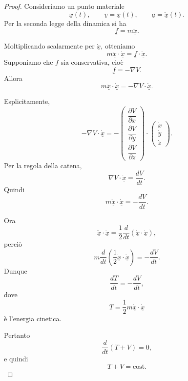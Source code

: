 \begin{proof}
Consideriamo un punto materiale
\[
\underline{x}(t),
\qquad
\underline{v}=\dot{\underline{x}}(t),
\qquad
\underline{a}=\ddot{\underline{x}}(t).
\]
Per la seconda legge della dinamica si ha
\[
\underline{f}=m\ddot{\underline{x}}.
\]

Moltiplicando scalarmente per \(\dot{\underline{x}}\), otteniamo
\[
m\ddot{\underline{x}}\cdot \dot{\underline{x}}
=
\underline{f}\cdot \dot{\underline{x}}.
\]
Supponiamo che \(\underline{f}\) sia conservativa, cioè
\[
\underline{f}=-\nabla V.
\]
Allora
\[
m\ddot{\underline{x}}\cdot \dot{\underline{x}}
=
-\nabla V\cdot \dot{\underline{x}}.
\]

Esplicitamente,
\[
-\nabla V\cdot \dot{\underline{x}}
=
-
\begin{pmatrix}
\dfrac{\partial V}{\partial x}\\[2mm]
\dfrac{\partial V}{\partial y}\\[2mm]
\dfrac{\partial V}{\partial z}
\end{pmatrix}
\cdot
\begin{pmatrix}
\dot{x}\\[1mm]
\dot{y}\\[1mm]
\dot{z}
\end{pmatrix}.
\]
Per la regola della catena,
\[
\nabla V\cdot \dot{\underline{x}}
=
\frac{dV}{dt}.
\]
Quindi
\[
m\ddot{\underline{x}}\cdot \dot{\underline{x}}
=
-\frac{dV}{dt}.
\]

Ora
\[
\ddot{\underline{x}}\cdot \dot{\underline{x}}
=
\frac{1}{2}\frac{d}{dt}
\left(
\dot{\underline{x}}\cdot \dot{\underline{x}}
\right),
\]
perciò
\[
m\frac{d}{dt}
\left(
\frac{1}{2}\dot{\underline{x}}\cdot \dot{\underline{x}}
\right)
=
-\frac{dV}{dt}.
\]
Dunque
\[
\frac{dT}{dt}
=
-\frac{dV}{dt},
\]
dove
\[
T=
\frac{1}{2}m\dot{\underline{x}}\cdot \dot{\underline{x}}
\]
è l'energia cinetica.

Pertanto
\[
\frac{d}{dt}(T+V)=0,
\]
e quindi
\[
T+V=\text{cost}.
\]
\end{proof}


